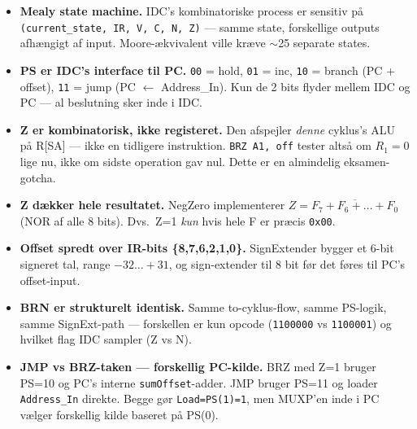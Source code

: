 \documentclass[11pt,a4paper]{article}
\begin{document}
\begin{itemize}
  \item \textbf{Mealy state machine.} IDC's kombinatoriske process er
        sensitiv på \texttt{(current\_state, IR, V, C, N, Z)} ---
        samme state, forskellige outputs afhængigt af input.
        Moore-ækvivalent ville kræve $\sim$25 separate states.

  \item \textbf{PS er IDC's interface til PC.}
        \texttt{00} = hold, \texttt{01} = inc, \texttt{10} = branch (PC + offset),
        \texttt{11} = jump (PC $\leftarrow$ Address\_In). Kun de 2 bits flyder
        mellem IDC og PC --- al beslutning sker inde i IDC.

  \item \textbf{Z er kombinatorisk, ikke registeret.}
        Den afspejler \emph{denne} cyklus's ALU på R[SA] ---
        ikke en tidligere instruktion. \texttt{BRZ A1, off}
        tester altså om \(R_1 = 0\) lige nu, ikke om sidste
        operation gav nul. Dette er en almindelig eksamen-gotcha.

  \item \textbf{Z dækker hele resultatet.}
        NegZero implementerer \(Z = \overline{F_7 + F_6 + \ldots + F_0}\)
        (NOR af alle 8 bits). Dvs.\ Z=1 \emph{kun} hvis hele
        F er præcis \texttt{0x00}.

  \item \textbf{Offset spredt over IR-bits \{8,7,6,2,1,0\}.}
        SignExtender bygger et 6-bit signeret tal,
        range \(-32 \ldots +31\), og sign-extender til 8 bit
        før det føres til PC's offset-input.

  \item \textbf{BRN er strukturelt identisk.} Samme to-cyklus-flow,
        samme PS-logik, samme SignExt-path --- forskellen er kun
        opcode (\texttt{1100000} vs \texttt{1100001}) og hvilket flag
        IDC sampler (Z vs N).

  \item \textbf{JMP vs BRZ-taken --- forskellig PC-kilde.}
        BRZ med Z=1 bruger PS=10 og PC's interne \texttt{sumOffset}-adder.
        JMP bruger PS=11 og loader \texttt{Address\_In} direkte. Begge gør \texttt{Load=PS(1)=1},
        men MUXP'en inde i PC vælger forskellig kilde baseret på PS(0).
\end{itemize}
\end{document}
